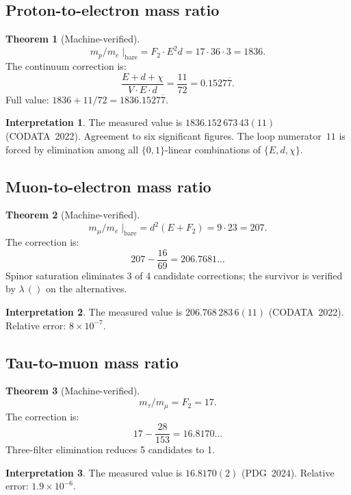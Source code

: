 \documentclass[11pt,a4paper]{article}
\theoremstyle{definition}
\newtheorem{theorem}{Theorem}[section]
\newtheorem*{interpretation}{Interpretation}
\begin{document}
\subsection{Proton-to-electron mass ratio}

\begin{theorem}[Machine-verified]
\[
  m_p / m_e \;\big|_{\mathrm{bare}} = F_2 \cdot E^2 d = 17 \cdot 36 \cdot 3 = 1836.
\]
The continuum correction is:
\[
  \frac{E + d + \chi}{V \cdot E \cdot d} = \frac{11}{72} = 0.1527\overline{7}.
\]
Full value: $1836 + 11/72 = 1836.1527\overline{7}$.
\end{theorem}

\begin{interpretation}
The measured value is $1836.152\,673\,43(11)$ (CODATA~2022).
Agreement to six significant figures.  The loop numerator~$11$ is forced
by elimination among all $\{0,1\}$-linear combinations of $\{E, d, \chi\}$.
\end{interpretation}

\subsection{Muon-to-electron mass ratio}

\begin{theorem}[Machine-verified]
\[
  m_\mu / m_e \;\big|_{\mathrm{bare}} = d^2(E + F_2) = 9 \cdot 23 = 207.
\]
The correction is:
\[
  207 - \frac{16}{69} = 206.7681\ldots
\]
Spinor saturation eliminates 3 of 4 candidate corrections;
the survivor is verified by $\lambda\,()$ on the alternatives.
\end{theorem}

\begin{interpretation}
The measured value is $206.768\,283\,6(11)$ (CODATA~2022).
Relative error: $8 \times 10^{-7}$.
\end{interpretation}

\subsection{Tau-to-muon mass ratio}

\begin{theorem}[Machine-verified]
\[
  m_\tau / m_\mu = F_2 = 17.
\]
The correction is:
\[
  17 - \frac{28}{153} = 16.8170\ldots
\]
Three-filter elimination reduces 5 candidates to 1.
\end{theorem}

\begin{interpretation}
The measured value is $16.8170(2)$ (PDG~2024).
Relative error: $1.9 \times 10^{-6}$.
\end{interpretation}
\end{document}
